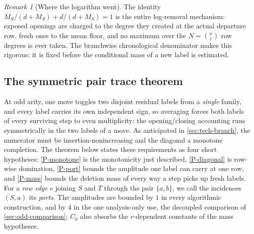 \documentclass[11pt]{article}
\theoremstyle{definition}
\theoremstyle{remark}
\newtheorem{remark}[remark]{Remark}
\newcommand{\1}{\mathbf 1}
\numberwithin{equation}{section}
\begin{document}
\begin{remark}[Where the logarithm went]\label{rem:sharp-openings}
The identity $M_S/(d+M_S)+d/(d+M_S)=1$ is the entire log-removal
mechanism: exposed openings are charged to the degree they created at
the actual departure row, fresh ones to the mean floor, and no maximum
over the $N=\binom n\ell$ row degrees is ever taken.  The branchwise
chronological denominator makes this rigorous: it is fixed before the
conditional mass of a new label is estimated.
\end{remark}

\subsection{The symmetric pair trace theorem}

At odd arity, one move toggles two disjoint residual labels from a
\emph{single} family, and every label carries its own independent
sign, so averaging forces both labels of every surviving step to even
multiplicity: the opening/closing accounting runs symmetrically in the
two labels of a move.  As anticipated in \cref{sec:tech-branch}, the
numerator must be insertion-nonincreasing and the diagonal a monotone
completion.  The theorem below states these requirements as four short
hypotheses: \ref{P-monotone} is the monotonicity just described,
\ref{P-diagonal} is row-wise domination, \ref{P-port} bounds the
amplitude one label can carry at one row, and \ref{P-mass} bounds the
deletion mass of every way a step picks up fresh labels.  For a
\emph{row edge} $e$ joining $S$ and $T$ through the pair $\{a,b\}$, we
call the incidences $(S,a)$ its \emph{ports}.  The amplitudes are
bounded by $1$ in every algorithmic construction, and by $4$ in the one
analysis-only use, the decoupled comparison of
\cref{sec:odd-comparison}; $C_0$ also absorbs the $r$-dependent
constants of the mass hypotheses.
\end{document}
